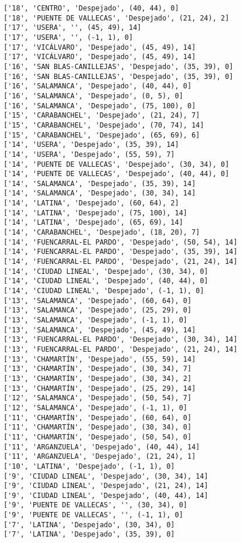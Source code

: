 \documentclass[11pt]{article}
\begin{document}
\begin{Verbatim}[commandchars=\\\{\}]
['18', 'CENTRO', 'Despejado', (40, 44), 0]
['18', 'PUENTE DE VALLECAS', 'Despejado', (21, 24), 2]
['17', 'USERA', '', (45, 49), 14]
['17', 'USERA', '', (-1, 1), 0]
['17', 'VICÁLVARO', 'Despejado', (45, 49), 14]
['17', 'VICÁLVARO', 'Despejado', (45, 49), 14]
['16', 'SAN BLAS-CANILLEJAS', 'Despejado', (35, 39), 0]
['16', 'SAN BLAS-CANILLEJAS', 'Despejado', (35, 39), 0]
['16', 'SALAMANCA', 'Despejado', (40, 44), 0]
['16', 'SALAMANCA', 'Despejado', (0, 5), 0]
['16', 'SALAMANCA', 'Despejado', (75, 100), 0]
['15', 'CARABANCHEL', 'Despejado', (21, 24), 7]
['15', 'CARABANCHEL', 'Despejado', (70, 74), 14]
['15', 'CARABANCHEL', 'Despejado', (65, 69), 6]
['14', 'USERA', 'Despejado', (35, 39), 14]
['14', 'USERA', 'Despejado', (55, 59), 7]
['14', 'PUENTE DE VALLECAS', 'Despejado', (30, 34), 0]
['14', 'PUENTE DE VALLECAS', 'Despejado', (40, 44), 0]
['14', 'SALAMANCA', 'Despejado', (35, 39), 14]
['14', 'SALAMANCA', 'Despejado', (30, 34), 14]
['14', 'LATINA', 'Despejado', (60, 64), 2]
['14', 'LATINA', 'Despejado', (75, 100), 14]
['14', 'LATINA', 'Despejado', (65, 69), 14]
['14', 'CARABANCHEL', 'Despejado', (18, 20), 7]
['14', 'FUENCARRAL-EL PARDO', 'Despejado', (50, 54), 14]
['14', 'FUENCARRAL-EL PARDO', 'Despejado', (35, 39), 14]
['14', 'FUENCARRAL-EL PARDO', 'Despejado', (21, 24), 14]
['14', 'CIUDAD LINEAL', 'Despejado', (30, 34), 0]
['14', 'CIUDAD LINEAL', 'Despejado', (40, 44), 0]
['14', 'CIUDAD LINEAL', 'Despejado', (-1, 1), 0]
['13', 'SALAMANCA', 'Despejado', (60, 64), 0]
['13', 'SALAMANCA', 'Despejado', (25, 29), 0]
['13', 'SALAMANCA', 'Despejado', (-1, 1), 0]
['13', 'SALAMANCA', 'Despejado', (45, 49), 14]
['13', 'FUENCARRAL-EL PARDO', 'Despejado', (30, 34), 14]
['13', 'FUENCARRAL-EL PARDO', 'Despejado', (21, 24), 14]
['13', 'CHAMARTÍN', 'Despejado', (55, 59), 14]
['13', 'CHAMARTÍN', 'Despejado', (30, 34), 7]
['13', 'CHAMARTÍN', 'Despejado', (30, 34), 2]
['13', 'CHAMARTÍN', 'Despejado', (25, 29), 14]
['12', 'SALAMANCA', 'Despejado', (50, 54), 7]
['12', 'SALAMANCA', 'Despejado', (-1, 1), 0]
['11', 'CHAMARTÍN', 'Despejado', (60, 64), 0]
['11', 'CHAMARTÍN', 'Despejado', (30, 34), 0]
['11', 'CHAMARTÍN', 'Despejado', (50, 54), 0]
['11', 'ARGANZUELA', 'Despejado', (40, 44), 14]
['11', 'ARGANZUELA', 'Despejado', (21, 24), 1]
['10', 'LATINA', 'Despejado', (-1, 1), 0]
['9', 'CIUDAD LINEAL', 'Despejado', (30, 34), 14]
['9', 'CIUDAD LINEAL', 'Despejado', (21, 24), 14]
['9', 'CIUDAD LINEAL', 'Despejado', (40, 44), 14]
['9', 'PUENTE DE VALLECAS', '', (30, 34), 0]
['9', 'PUENTE DE VALLECAS', '', (-1, 1), 0]
['7', 'LATINA', 'Despejado', (30, 34), 0]
['7', 'LATINA', 'Despejado', (35, 39), 0]

\end{Verbatim}
\end{document}
